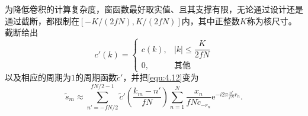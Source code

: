 \documentclass[12pt]{article}
\let\originallautoref\autoref
\renewcommand{\autoref}[1]{\allowbreak\originallautoref{#1}}
\begin{document}
为降低卷积的计算复杂度，窗函数最好取实值、且其支撑有限，无论通过设计还是通过截断，都限制在$[-K/(2fN),K/(2fN)]$内，其中正整数$K$称为核尺寸。截断给出
\begin{equation}
    c'(k)=\begin{cases}
        c(k), & |k|\le\dfrac{K}{2fN}\\[2mm]
        0, & \text{其他}
    \end{cases}
    \label{equ:4.19}
\end{equation}
以及相应的周期为$1$的周期函数$\tilde{c}'$，并把\autoref{equ:4.12}变为
\begin{equation}
    \tilde{s}_m\approx\sum_{n'=-fN/2}^{fN/2-1}\tilde{c}'\left(\frac{k_m-n'}{fN}\right)\sum_{n=1}^{N}\frac{x_n}{fN\tilde{c}_{-r_n}}\mathrm{e}^{-i2\pi\frac{n'}{fN}r_n}.
    \label{equ:4.20}
\end{equation}
\end{document}
